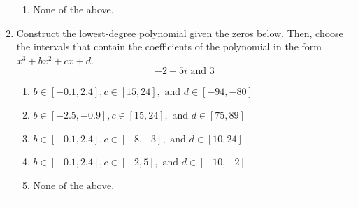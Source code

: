 \documentclass[14pt]{extbook}
\newcommand{\litem}[1]{\item#1\hspace*{-1cm}\rule{\textwidth}{0.4pt}}
\begin{document}
\begin{enumerate}
{\begin{enumerate}[label=\Alph*.]
\item None of the above.
\end{enumerate} }
\litem{
Construct the lowest-degree polynomial given the zeros below. Then, choose the intervals that contain the coefficients of the polynomial in the form $x^3+bx^2+cx+d$.\[ -2 + 5 i \text{ and } 3 \]\begin{enumerate}[label=\Alph*.]
\item \( b \in [-0.1, 2.4], c \in [15, 24], \text{ and } d \in [-94, -80] \)
\item \( b \in [-2.5, -0.9], c \in [15, 24], \text{ and } d \in [75, 89] \)
\item \( b \in [-0.1, 2.4], c \in [-8, -3], \text{ and } d \in [10, 24] \)
\item \( b \in [-0.1, 2.4], c \in [-2, 5], \text{ and } d \in [-10, -2] \)
\item \( \text{None of the above.} \)


\end{enumerate}}
\end{enumerate}
\end{document}
